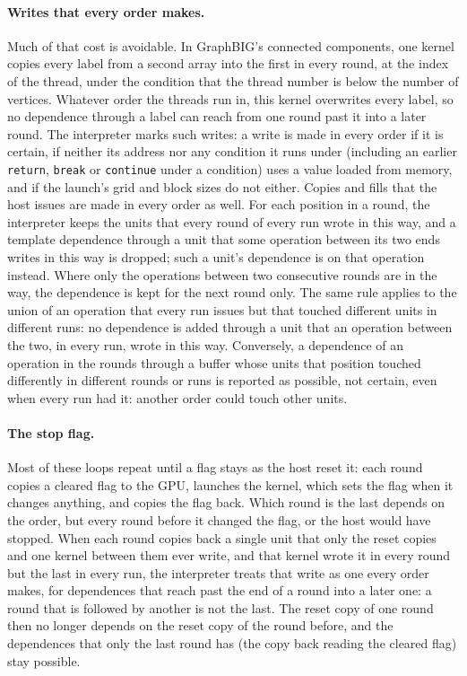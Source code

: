 \documentclass[11pt]{article}
\newcommand{\code}[1]{\texttt{#1}}
\begin{document}
\paragraph{Writes that every order makes.} Much of that cost is avoidable. In GraphBIG's connected components,
one kernel copies every label from a second array into the first in every round, at the index of the thread, under
the condition that the thread number is below the number of vertices. Whatever order the threads run in, this
kernel overwrites every label, so no dependence through a label can reach from one round past it into a later
round. The interpreter marks such writes: a write is made in every order if it is certain, if neither its address
nor any condition it runs under (including an earlier \code{return}, \code{break} or \code{continue} under a
condition) uses a value loaded from memory, and if the launch's grid and block sizes do not either. Copies and fills
that the host issues are made in every order as well. For each position in a round, the interpreter keeps the units
that every round of every run wrote in this way, and a template dependence through a unit that some operation
between its two ends writes in this way is dropped; such a unit's dependence is on that operation instead. Where
only the operations between two consecutive rounds are in the way, the dependence is kept for the next round only.
The same rule applies to the union of an operation that every run issues but that touched different units in
different runs: no dependence is added through a unit that an operation between the two, in every run, wrote in
this way.
Conversely, a dependence of an operation in the rounds through a buffer whose units that position touched
differently in different rounds or runs is reported as possible, not certain, even when every run had it: another
order could touch other units.

\paragraph{The stop flag.} Most of these loops repeat until a flag stays as the host reset it: each round copies a
cleared flag to the GPU, launches the kernel, which sets the flag when it changes anything, and copies the flag
back. Which round is the last depends on the order, but every round before it changed the flag, or the host would
have stopped. When each round copies back a single unit that only the reset copies and one kernel between them
ever write, and that kernel wrote it in every round but the last in every run, the interpreter treats that write
as one every order makes, for dependences that reach past the end of a round into a later one: a round that is
followed by another is not the last. The reset copy of one round then no longer depends on the reset copy of the
round before, and the dependences that only the last round has (the copy back reading the cleared flag) stay
possible.
\end{document}

